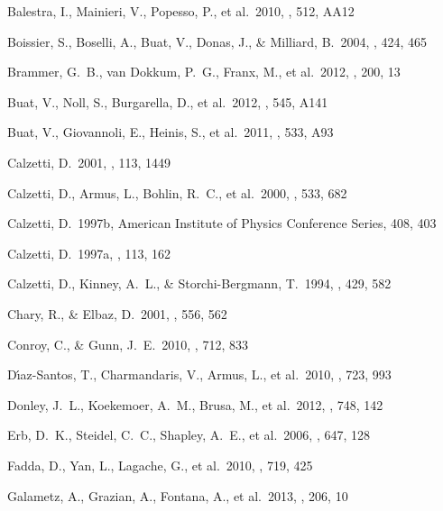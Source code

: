 \documentclass[referee]{aa}
\begin{document}
\begin{thebibliography}{}

 Balestra, I., Mainieri, V., Popesso,
P., et al.\ 2010, \aap, 512, AA12

 Boissier, S., Boselli, A.,
Buat, V., Donas, J., \& Milliard, B.\ 2004, \aap, 424, 465

 Brammer, G.~B., van 
Dokkum, P.~G., Franx, M., et al.\ 2012, \apjs, 200, 13

 Buat, V., Noll, S., Burgarella, D.,
et al.\ 2012, \aap, 545, A141 

 Buat, V., Giovannoli, E., Heinis, S.,
et al.\ 2011, \aap, 533, A93 

 Calzetti, D.\ 2001, \pasp, 113, 1449

 Calzetti, D., Armus, L., Bohlin,
R.~C., et al.\ 2000, \apj, 533, 682

 Calzetti, D.\ 1997b, American 
Institute of Physics Conference Series, 408, 403

 Calzetti, D.\ 1997a, \aj, 113, 162

 Calzetti, D., Kinney, A.~L., \&
Storchi-Bergmann, T.\ 1994, \apj, 429, 582

 Chary, R., \& Elbaz, D.\ 2001, \apj,
556, 562

 Conroy, C., \& Gunn, J.~E.\ 2010, \apj,
712, 833

 D{\'{\i}}az-Santos, T.,
Charmandaris, V., Armus, L., et al.\ 2010, \apj, 723, 993

 Donley, J.~L., Koekemoer, A.~M.,
Brusa, M., et al.\ 2012, \apj, 748, 142

 Erb, D.~K., Steidel, C.~C., 
Shapley, A.~E., et al.\ 2006, \apj, 647, 128

 Fadda, D., Yan, L., 
Lagache, G., et al.\ 2010, \apj, 719, 425

 Galametz, A., Grazian, A.,
Fontana, A., et al.\ 2013, \apjs, 206, 10


\end{thebibliography}
\end{document}
